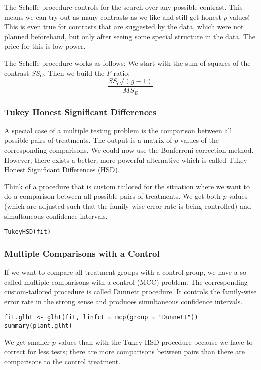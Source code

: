 The Scheffe procedure controls for the search over any possible contrast. This means we can try out as many contrasts as we like and still get honest $p$-values! This is even true for contrasts that are suggested by the data, which were not planned beforehand, but only after seeing some special structure in the data. The price for this is low power. \medskip

The Scheffe procedure works as follows: We start with the sum of squares of the contrast $SS_C$. Then we build the $F$-ratio:
$$\frac{SS_C/(g-1)}{MS_E}$$

\subsubsection{Tukey Honest Significant Differences}

A special case of a multiple testing problem is the comparison between all possible pairs of treatments. The output is a matrix of $p$-values of the corresponding comparisons. We could now use the Bonferroni correction method. However, there exists a better, more powerful alternative which is called Tukey Honest Significant Differences (HSD).\medskip

Think of a procedure that is custom tailored for the situation where we want to do a comparison between all possible pairs of treatments. We get both $p$-values (which are adjusted such that the family-wise error rate is being controlled) and simultaneous confidence intervals.
\begin{lstlisting}
TukeyHSD(fit)
\end{lstlisting}


\subsubsection{Multiple Comparisons with a Control}

If we want to compare all treatment groups with a control group, we have a so-called multiple comparisons with a control (MCC) problem. The corresponding custom-tailored procedure is called Dunnett procedure. It controls the family-wise error rate in the strong sense and produces simultaneous confidence intervals.
 
\begin{lstlisting}
fit.glht <- glht(fit, linfct = mcp(group = "Dunnett"))
summary(plant.glht)
\end{lstlisting}

 We get smaller $p$-values than with the Tukey HSD procedure because we have to correct for less tests; there are more comparisons between pairs than there are comparisons to the control treatment.
